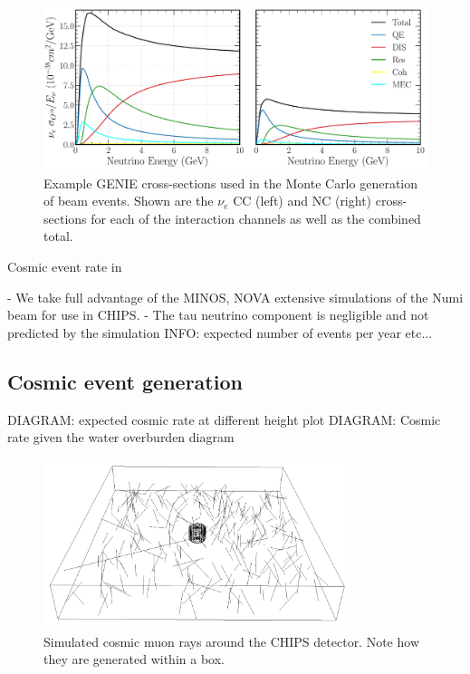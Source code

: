 \begin{figure} %
    \includegraphics[width=\textwidth]{diagrams/4-chips/xsec_nu_e_O16.pdf}
    \caption[$\nu_{e}$ GENIE cross-sections.]
    {Example GENIE cross-sections used in the Monte Carlo generation of beam events. Shown are the
        $\nu_{e}$ CC (left) and NC (right) cross-sections for each of the interaction channels as
        well as the combined total.}
    \label{fig:xsec_nu_e_O16}
\end{figure}

Cosmic event rate in \cite{son2013}

- We take full advantage of the MINOS, NOVA extensive simulations of the Numi beam for use in
CHIPS.
- The tau neutrino component is negligible and not predicted by the simulation
INFO: expected number of events per year etc...

\subsection{Cosmic event generation} %
\label{sec:chips_monte_carlo_cosmic} %

DIAGRAM: expected cosmic rate at different height plot
DIAGRAM: Cosmic rate given the water overburden diagram

\begin{figure} %
    \includegraphics[width=0.8\textwidth]{diagrams/4-chips/cosmics.png}
    \caption[Cosmic muon rays around the CHIPS detector]
    {Simulated cosmic muon rays around the CHIPS detector. Note how they are generated within a
        box.}
    \label{fig:cosmics}
\end{figure}

